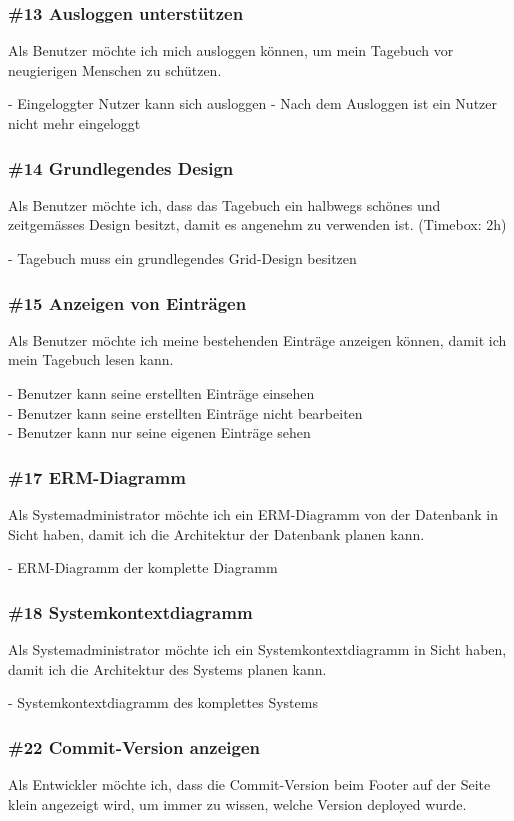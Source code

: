 \subsubsection*{\#13 Ausloggen unterstützen}
Als Benutzer möchte ich mich ausloggen können, um mein Tagebuch vor neugierigen Menschen zu schützen.

\noindent
- Eingeloggter Nutzer kann sich ausloggen
- Nach dem Ausloggen ist ein Nutzer nicht mehr eingeloggt


\subsubsection*{\#14 Grundlegendes Design}
Als Benutzer möchte ich, dass das Tagebuch ein halbwegs schönes und zeitgemässes Design besitzt, damit es angenehm zu verwenden ist. (Timebox: 2h)

\noindent
- Tagebuch muss ein grundlegendes Grid-Design besitzen


\subsubsection*{\#15 Anzeigen von Einträgen}
Als Benutzer möchte ich meine bestehenden Einträge anzeigen können, damit ich mein Tagebuch lesen kann.

\noindent
- Benutzer kann seine erstellten Einträge einsehen\\
- Benutzer kann seine erstellten Einträge nicht bearbeiten\\
- Benutzer kann nur seine eigenen Einträge sehen

\subsubsection*{\#17 ERM-Diagramm}
Als Systemadministrator möchte ich ein ERM-Diagramm von der Datenbank in Sicht haben, damit ich die Architektur der Datenbank planen kann.

\noindent
- ERM-Diagramm der komplette Diagramm

\subsubsection*{\#18 Systemkontextdiagramm}
Als Systemadministrator möchte ich ein Systemkontextdiagramm in Sicht haben, damit ich die Architektur des Systems planen kann.

\noindent
- Systemkontextdiagramm des komplettes Systems

\subsubsection*{\#22 Commit-Version anzeigen}
Als Entwickler möchte ich, dass die Commit-Version beim Footer auf der Seite klein angezeigt wird, um immer zu wissen, welche Version deployed wurde.

